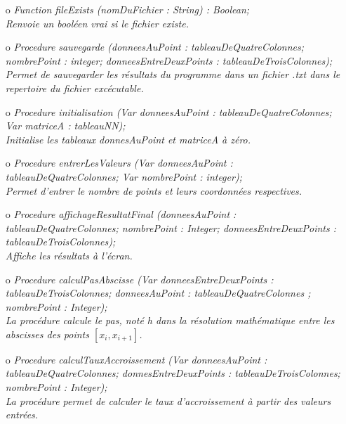 \documentclass{article}
\begin{document}
\begin{enumerate}
	\item[o] \it Function fileExists (nomDuFichier : String) : Boolean;\\
	\rm Renvoie un bool\'{e}en vrai si le fichier existe.\\
	
	\item[o] \it Procedure sauvegarde (donneesAuPoint : tableauDeQuatreColonnes; nombrePoint : integer; donneesEntreDeuxPoints : tableauDeTroisColonnes);\\
	\rm Permet de sauvegarder les r\'{e}sultats du programme dans un fichier .txt dans le repertoire du fichier exc\'{e}cutable.\\
	
	\item[o] \it Procedure initialisation (Var donneesAuPoint : tableauDeQuatreColonnes; Var matriceA : tableauNN);\\
	\rm Initialise les tableaux \it donnesAuPoint \rm et \it matriceA \rm \`a z\'{e}ro.\\
	
	\item[o] \it Procedure entrerLesValeurs (Var donneesAuPoint : tableauDeQuatreColonnes; Var nombrePoint : integer);\\
	\rm Permet d'entrer le nombre de points et leurs coordonn\'ees respectives.\\
	
	\item[o] \it Procedure affichageResultatFinal (donneesAuPoint : tableauDeQuatreColonnes; nombrePoint : Integer; donneesEntreDeuxPoints : tableauDeTroisColonnes);\\
	\rm Affiche les r\'{e}sultats \`a l'\'{e}cran.\\
	
	\item[o] \it Procedure calculPasAbscisse (Var donneesEntreDeuxPoints : tableauDeTroisColonnes; donneesAuPoint : tableauDeQuatreColonnes ; nombrePoint : Integer); \\
	\rm La proc\'{e}dure calcule le pas, not\'e \it h \rm dans la r\'{e}solution math\'{e}matique entre les abscisses des points  $[x_{i},x_{i+1}]$.\\
	
	\item[o] \it Procedure calculTauxAccroissement (Var donneesAuPoint : tableauDeQuatreColonnes; donnesEntreDeuxPoints : tableauDeTroisColonnes; nombrePoint : Integer);\\
	\rm La proc\'{e}dure permet de calculer le taux d'accroissement \`a partir des valeurs entr\'ees.\\
	

\end{enumerate}
\end{document}
